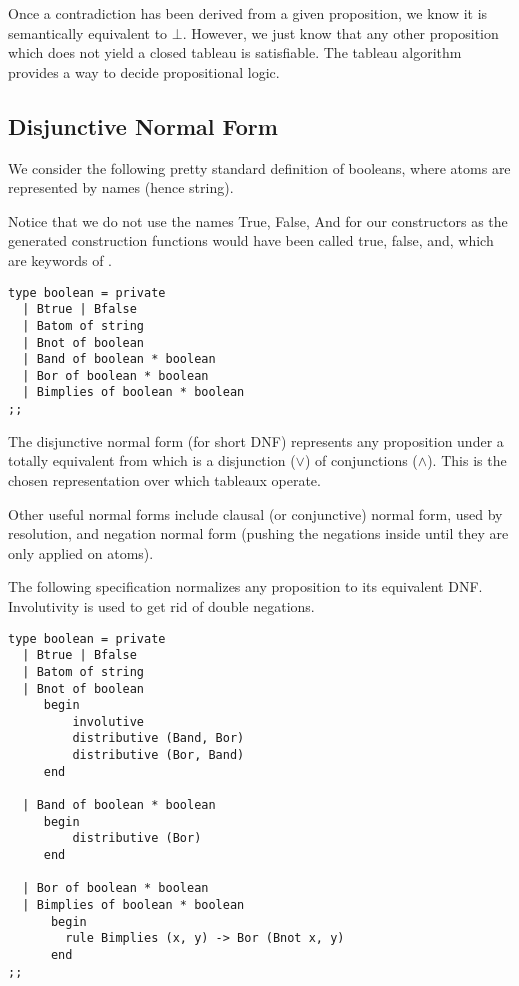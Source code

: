 Once a contradiction has been derived from a given proposition, we
know it is semantically equivalent to $\bot$. However, we just know
that any other proposition which does not yield a closed tableau is
satisfiable. The tableau algorithm provides a way to decide
propositional logic. 

\subsection{Disjunctive Normal Form}
We consider the following pretty standard definition of booleans,
where atoms are represented by names (hence {\sf string}).

Notice that we do not use the names {\sf True, False, And} for our
constructors as
the generated construction functions would have been called 
{\sf true, false, and}, which are keywords of \ocaml.

\begin{lstlisting}
type boolean = private
  | Btrue | Bfalse
  | Batom of string
  | Bnot of boolean
  | Band of boolean * boolean
  | Bor of boolean * boolean
  | Bimplies of boolean * boolean 
;;
\end{lstlisting}

The disjunctive normal form (for short DNF) represents any proposition
under a totally equivalent from which is a disjunction ($\vee$) of
conjunctions ($\land$). This is the chosen representation over which
tableaux operate.

Other useful normal forms include clausal (or
conjunctive) normal form, used by resolution, and negation normal form
(pushing the negations inside until they are only applied on atoms).

The following \moca specification normalizes any proposition to its
equivalent DNF. Involutivity is used to get rid of double negations.

\begin{lstlisting}[float, caption={Propositional tableaux}, label={lst:proptab}]
 type boolean = private
  | Btrue | Bfalse
  | Batom of string
  | Bnot of boolean
     begin 
         involutive 
         distributive (Band, Bor) 
         distributive (Bor, Band) 
     end 

  | Band of boolean * boolean
     begin 
         distributive (Bor) 
     end

  | Bor of boolean * boolean      
  | Bimplies of boolean * boolean 
      begin 
        rule Bimplies (x, y) -> Bor (Bnot x, y) 
      end
;;

\end{lstlisting}


